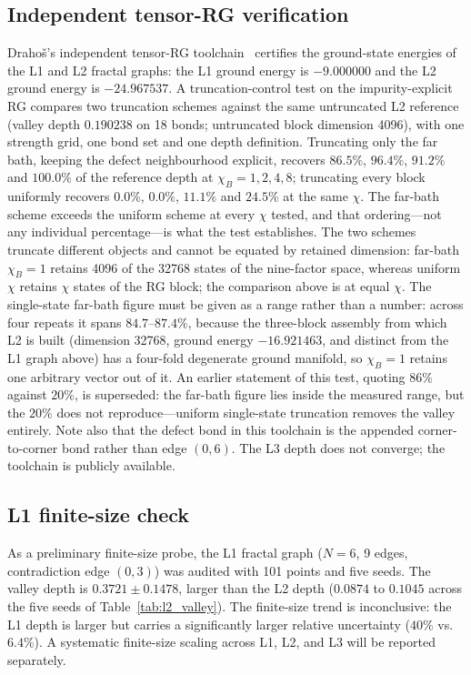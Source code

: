 \documentclass[aps,prb,reprint,superscriptaddress]{revtex4-2}
\begin{document}
\subsection{Independent tensor-RG verification}

Draho\v{s}'s independent tensor-RG toolchain~\cite{Drahos2026GitHub} certifies the ground-state energies of the L1 and L2 fractal graphs: the L1 ground energy is $-9.000000$ and the L2 ground energy is $-24.967537$. A truncation-control test on the impurity-explicit RG compares two truncation schemes against the same untruncated L2 reference (valley depth $0.190238$ on 18 bonds; untruncated block dimension 4096), with one strength grid, one bond set and one depth definition. Truncating only the far bath, keeping the defect neighbourhood explicit, recovers $86.5\%$, $96.4\%$, $91.2\%$ and $100.0\%$ of the reference depth at $\chi_B=1,2,4,8$; truncating every block uniformly recovers $0.0\%$, $0.0\%$, $11.1\%$ and $24.5\%$ at the same $\chi$. The far-bath scheme exceeds the uniform scheme at every $\chi$ tested, and that ordering---not any individual percentage---is what the test establishes. The two schemes truncate different objects and cannot be equated by retained dimension: far-bath $\chi_B=1$ retains 4096 of the 32768 states of the nine-factor space, whereas uniform $\chi$ retains $\chi$ states of the RG block; the comparison above is at equal $\chi$. The single-state far-bath figure must be given as a range rather than a number: across four repeats it spans $84.7$--$87.4\%$, because the three-block assembly from which L2 is built (dimension 32768, ground energy $-16.921463$, and distinct from the L1 graph above) has a four-fold degenerate ground manifold, so $\chi_B=1$ retains one arbitrary vector out of it. An earlier statement of this test, quoting $86\%$ against $20\%$, is superseded: the far-bath figure lies inside the measured range, but the $20\%$ does not reproduce---uniform single-state truncation removes the valley entirely. Note also that the defect bond in this toolchain is the appended corner-to-corner bond rather than edge $(0,6)$. The L3 depth does not converge; the toolchain is publicly available.

\subsection{L1 finite-size check}

As a preliminary finite-size probe, the L1 fractal graph ($N=6$, 9 edges, contradiction edge $(0,3)$) was audited with 101 points and five seeds. The valley depth is $0.3721\pm0.1478$, larger than the L2 depth ($0.0874$ to $0.1045$ across the five seeds of Table~\ref{tab:l2_valley}). The finite-size trend is inconclusive: the L1 depth is larger but carries a significantly larger relative uncertainty ($40\%$ vs.\ $6.4\%$). A systematic finite-size scaling across L1, L2, and L3 will be reported separately.
\end{document}

